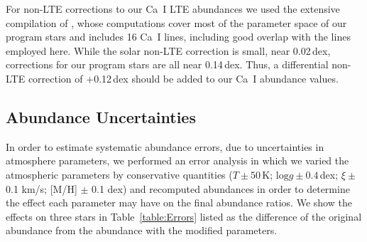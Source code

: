 \documentclass[revtex4]{emulateapj}
\begin{document}
For non-LTE corrections to our Ca~I LTE abundances we used the extensive compilation of \citet{Mash2007}, whose computations cover most of the parameter space of our program stars and includes 16 Ca~I lines, including good overlap with the lines employed here.  While the solar non-LTE correction is small, near 0.02\,dex, corrections for our program stars are all near 0.14\,dex.  Thus, a differential non-LTE correction of +0.12\,dex should be added to our Ca~I abundance values.

\subsection{Abundance Uncertainties}\label{sec:Errors}
In order to estimate systematic abundance errors, due to uncertainties in atmosphere parameters, we performed an error analysis in which we varied the atmospheric parameters by conservative quantities ($T\pm50$\,K; $\mathrm{log }g\pm 0.4$\,dex; $\xi\pm$ 0.1 km/s; [M/H] $\pm$ 0.1 dex) and recomputed abundances in order to determine the effect each parameter may have on the final abundance ratios.  We show the effects on three stars in Table~\ref{table:Errors} listed as the difference of the original abundance from the abundance with the modified parameters.  
\end{document}
